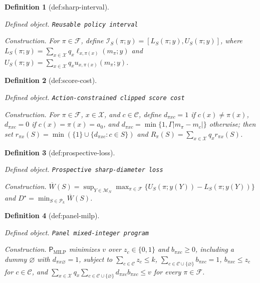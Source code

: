\documentclass{article}
\newtheorem{definition}{Definition}
\begin{document}
\begin{definition}[def:sharp-interval]\label{def:sharp-interval}
\par\smallskip\noindent\emph{Defined object.} \texttt{Reusable policy interval}
\par\smallskip\noindent\emph{Construction.} For \(\pi\in\mathcal F\), define \(\mathcal I_S(\pi;y)=[L_S(\pi;y),U_S(\pi;y)]\), where \(L_S(\pi;y)=\sum_{x\in\mathcal X}q_x\ell_{x,\pi(x)}(m_{\pi};y)\) and \(U_S(\pi;y)=\sum_{x\in\mathcal X}q_xu_{x,\pi(x)}(m_{\pi};y)\).
\end{definition}

\begin{definition}[def:score-cost]\label{def:score-cost}
\par\smallskip\noindent\emph{Defined object.} \texttt{Action-\allowbreak{}constrained clipped score cost}
\par\smallskip\noindent\emph{Construction.} For \(\pi\in\mathcal F\), \(x\in\mathcal X\), and \(c\in\mathcal C\), define \(d_{\pi xc}=1\) if \(c(x)\neq\pi(x)\), \(d_{\pi xc}=0\) if \(c(x)=\pi(x)=a_0\), and \(d_{\pi xc}=\min\{1,\Gamma|m_{\pi}-m_c|\}\) otherwise; then set \(r_{\pi x}(S)=\min(\{1\}\cup\{d_{\pi xc}:c\in S\})\) and \(R_{\pi}(S)=\sum_{x\in\mathcal X}q_xr_{\pi x}(S)\).
\end{definition}

\begin{definition}[def:prospective-loss]\label{def:prospective-loss}
\par\smallskip\noindent\emph{Defined object.} \texttt{Prospective sharp-\allowbreak{}diameter loss}
\par\smallskip\noindent\emph{Construction.} \(\overline W(S)=\sup_{Y\in\mathcal M_N}\max_{\pi\in\mathcal F}\{U_S(\pi;y(Y))-L_S(\pi;y(Y))\}\) and \(D^{\star}=\min_{S\in\mathcal P_k}\overline W(S)\).
\end{definition}

\begin{definition}[def:panel-milp]\label{def:panel-milp}
\par\smallskip\noindent\emph{Defined object.} \texttt{Panel mixed-\allowbreak{}integer program}
\par\smallskip\noindent\emph{Construction.} \(\mathsf P_{\mathrm{MILP}}\) minimizes \(v\) over \(z_c\in\{0,1\}\) and \(b_{\pi xc}\geq0\), including a dummy \(\varnothing\) with \(d_{\pi x\varnothing}=1\), subject to \(\sum_{c\in\mathcal C}z_c\leq k\), \(\sum_{c\in\mathcal C\cup\{\varnothing\}}b_{\pi xc}=1\), \(b_{\pi xc}\leq z_c\) for \(c\in\mathcal C\), and \(\sum_{x\in\mathcal X}q_x\sum_{c\in\mathcal C\cup\{\varnothing\}}d_{\pi xc}b_{\pi xc}\leq v\) for every \(\pi\in\mathcal F\).
\end{definition}
\end{document}
